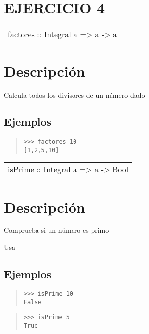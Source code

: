 \section{EJERCICIO 4}
\begin{haddockdesc}
\item[\begin{tabular}{@{}l}
factores :: Integral a => a -> {\char 91}a{\char 93}
\end{tabular}]
{\haddockbegindoc
\section*{Descripción}
Calcula todos los divisores de un número dado\par
\subsection*{Ejemplos}
\begin{quote}
{\haddockverb\begin{verbatim}
>>> factores 10
[1,2,5,10]

\end{verbatim}}
\end{quote}}
\end{haddockdesc}
\begin{haddockdesc}
\item[\begin{tabular}{@{}l}
isPrime :: Integral a => a -> Bool
\end{tabular}]
{\haddockbegindoc
\section*{Descripción}
Comprueba si un número es primo\par
Usa \par
\subsection*{Ejemplos}
\begin{quote}
{\haddockverb\begin{verbatim}
>>> isPrime 10
False

\end{verbatim}}
\end{quote}
\begin{quote}
{\haddockverb\begin{verbatim}
>>> isPrime 5
True

\end{verbatim}}
\end{quote}}
\end{haddockdesc}
